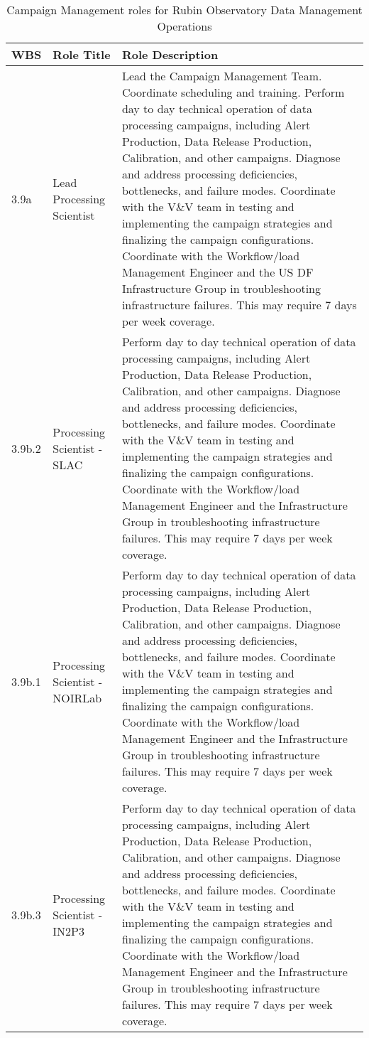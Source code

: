 \normalsize \begin{longtable} {|p{}|p{}|p{}|} \caption{Campaign Management roles for Rubin Observatory Data Management Operations \label{tab:cmroles}}\\ 
\hline 
\textbf{WBS}&\textbf{Role Title}&\textbf{Role Description} \\ \hline
{3.9a}&{Lead Processing Scientist}&{Lead the Campaign Management Team. Coordinate scheduling and training. Perform day to day technical operation of data processing campaigns, including Alert Production, Data Release Production, Calibration, and other campaigns. Diagnose and address processing deficiencies, bottlenecks, and failure modes. Coordinate with the V\&V team in testing and implementing the campaign strategies and finalizing the campaign configurations. Coordinate with the Workflow/load Management Engineer and the US DF Infrastructure Group in troubleshooting infrastructure failures. This may require 7 days per week coverage.} \\ \hline
{3.9b.2}&{Processing Scientist - SLAC}&{Perform day to day technical operation of data processing campaigns, including Alert Production, Data Release Production, Calibration, and other campaigns. Diagnose and address processing deficiencies, bottlenecks, and failure modes. Coordinate with the V\&V team in testing and implementing the campaign strategies and finalizing the campaign configurations. Coordinate with the Workflow/load Management Engineer and the Infrastructure Group in troubleshooting infrastructure failures. This may require 7 days per week coverage.} \\ \hline
{3.9b.1}&{Processing Scientist - NOIRLab}&{Perform day to day technical operation of data processing campaigns, including Alert Production, Data Release Production, Calibration, and other campaigns. Diagnose and address processing deficiencies, bottlenecks, and failure modes. Coordinate with the V\&V team in testing and implementing the campaign strategies and finalizing the campaign configurations. Coordinate with the Workflow/load Management Engineer and the Infrastructure Group in troubleshooting infrastructure failures. This may require 7 days per week coverage.} \\ \hline
{3.9b.3}&{Processing Scientist - IN2P3}&{Perform day to day technical operation of data processing campaigns, including Alert Production, Data Release Production, Calibration, and other campaigns. Diagnose and address processing deficiencies, bottlenecks, and failure modes. Coordinate with the V\&V team in testing and implementing the campaign strategies and finalizing the campaign configurations. Coordinate with the Workflow/load Management Engineer and the Infrastructure Group in troubleshooting infrastructure failures. This may require 7 days per week coverage.} \\ \hline

\end{longtable}
